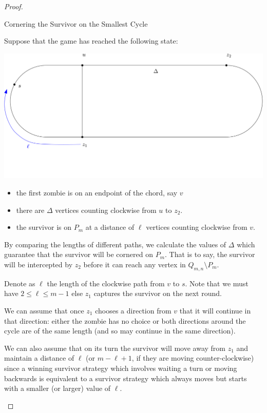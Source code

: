 \begin{proof}
 \newpage

 \begin{proofpart} Cornering the Survivor on the Smallest Cycle

   Suppose that the game has reached the following state:

  \begin{center}
    \includegraphics[scale=0.20]{q_m_n/diagram1}
  \end{center}

  \begin{itemize}
   \item the first zombie is on an endpoint of the chord, say $v$
   \item there are $\Delta$ vertices counting clockwise from $u$ to $z_2$.
   \item the survivor is on $P_m$ at a distance of $\ell$ vertices counting
   clockwise from $v$.
  \end{itemize}

  By comparing the lengths of different paths, we calculate the values of $\Delta$
  which guarantee that the survivor will be cornered on $P_m$. That is to say,
  the survivor will be intercepted by $z_2$ before it can reach any vertex
  in $Q_{m,n} \setminus P_m$.

  Denote as $\ell$ the length of the clockwise
  path from $v$ to $s$. Note that we must have $2 \leq \ell \leq m-1$ else
  $z_1$ captures the survivor on the next round.

  We can assume that once $z_1$ chooses a direction from $v$
  that it will continue in that direction:
  either the zombie has no choice or both directions around
  the cycle are of the same length (and so
  may continue in the same direction).

  We can also assume that on its turn the survivor will move away from
  $z_1$ and maintain a distance of $\ell$ (or $m-\ell +1$, if they are moving counter-clockwise)
  since a winning survivor strategy which involves waiting a turn
  or moving backwards is equivalent to a survivor strategy
  which always moves but starts with a smaller (or larger) value of $\ell$.


\end{proofpart}
\end{proof}
